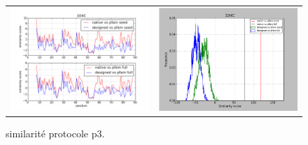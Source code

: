 \documentclass[a4paper,12pt]{article}
\begin{document}
\begin{figure}[t]
\begin{tabular}{cc}
       \includegraphics[width=8.45cm]{gen_08032012/1O4C/p3/graph_simil_bypos.png} &
       \includegraphics[width=8.45cm]{gen_08032012/1O4C/p3/graph_simil_byseq.png} \\

     \end{tabular}

     \caption{similarité protocole p3.}
   \end{figure}
\end{document}
